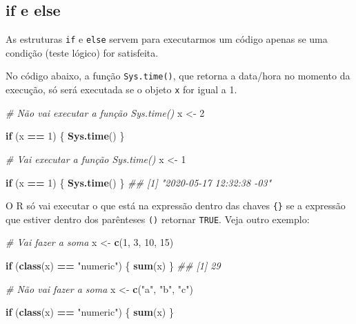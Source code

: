 \documentclass[]{book}
\newenvironment{Shaded}{\begin{snugshade}}{\end{snugshade}}
\newcommand{\CommentTok}[1]{\textcolor[rgb]{0.56,0.35,0.01}{\textit{#1}}}
\newcommand{\ControlFlowTok}[1]{\textcolor[rgb]{0.13,0.29,0.53}{\textbf{#1}}}
\newcommand{\DecValTok}[1]{\textcolor[rgb]{0.00,0.00,0.81}{#1}}
\newcommand{\KeywordTok}[1]{\textcolor[rgb]{0.13,0.29,0.53}{\textbf{#1}}}
\newcommand{\NormalTok}[1]{#1}
\newcommand{\OperatorTok}[1]{\textcolor[rgb]{0.81,0.36,0.00}{\textbf{#1}}}
\newcommand{\StringTok}[1]{\textcolor[rgb]{0.31,0.60,0.02}{#1}}
\begin{document}
\hypertarget{if-e-else}{%
\subsection{if e else}\label{if-e-else}}

As estruturas \texttt{if} e \texttt{else} servem para executarmos um código apenas se uma condição (teste lógico) for satisfeita.

No código abaixo, a função \texttt{Sys.time()}, que retorna a data/hora no momento da execução, só será executada se o objeto \texttt{x} for igual a 1.

\begin{Shaded}
\begin{Highlighting}[]
\CommentTok{# Não vai executar a função Sys.time()}
\NormalTok{x <-}\StringTok{ }\DecValTok{2}

\ControlFlowTok{if}\NormalTok{ (x }\OperatorTok{==}\StringTok{ }\DecValTok{1}\NormalTok{) \{         }
  \KeywordTok{Sys.time}\NormalTok{()}
\NormalTok{\}}

\CommentTok{# Vai executar a função Sys.time()}
\NormalTok{x <-}\StringTok{ }\DecValTok{1}

\ControlFlowTok{if}\NormalTok{ (x }\OperatorTok{==}\StringTok{ }\DecValTok{1}\NormalTok{) \{         }
  \KeywordTok{Sys.time}\NormalTok{()}
\NormalTok{\}}
\CommentTok{## [1] "2020-05-17 12:32:38 -03"}
\end{Highlighting}
\end{Shaded}

O R só vai executar o que está na expressão dentro das chaves \texttt{\{\}} se a expressão que estiver dentro dos parênteses \texttt{()} retornar \texttt{TRUE}. Veja outro exemplo:

\begin{Shaded}
\begin{Highlighting}[]
\CommentTok{# Vai fazer  a soma}
\NormalTok{x <-}\StringTok{ }\KeywordTok{c}\NormalTok{(}\DecValTok{1}\NormalTok{, }\DecValTok{3}\NormalTok{, }\DecValTok{10}\NormalTok{, }\DecValTok{15}\NormalTok{)}

\ControlFlowTok{if}\NormalTok{ (}\KeywordTok{class}\NormalTok{(x) }\OperatorTok{==}\StringTok{ "numeric"}\NormalTok{) \{}
  \KeywordTok{sum}\NormalTok{(x)}
\NormalTok{\}}
\CommentTok{## [1] 29}

\CommentTok{# Não vai fazer a soma}
\NormalTok{x <-}\StringTok{ }\KeywordTok{c}\NormalTok{(}\StringTok{"a"}\NormalTok{, }\StringTok{"b"}\NormalTok{, }\StringTok{"c"}\NormalTok{)}

\ControlFlowTok{if}\NormalTok{ (}\KeywordTok{class}\NormalTok{(x) }\OperatorTok{==}\StringTok{ "numeric"}\NormalTok{) \{}
  \KeywordTok{sum}\NormalTok{(x)}
\NormalTok{\}}
\end{Highlighting}
\end{Shaded}
\end{document}
